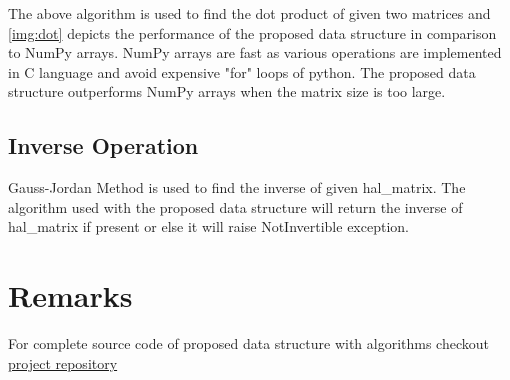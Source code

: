 \documentclass[11pt,twocolumn]{article}
\begin{document}
        The above algorithm is used to find the dot product of given two matrices and \cref{img:dot} depicts the performance of the proposed data structure in comparison to NumPy arrays. NumPy arrays are fast as various operations are implemented in C language and avoid expensive "for" loops of python. The proposed data structure outperforms NumPy arrays when the matrix size is too large.
        
    \subsection{Inverse Operation}

        Gauss-Jordan Method is used to find the inverse of given hal\_matrix. The algorithm used with the proposed data structure will return the inverse of hal\_matrix if present or else it will raise NotInvertible exception.
        
    \section{Remarks}

        For complete source code of proposed data structure with algorithms checkout \href{https://github.com/rishitoshsingh/hal-matrix}{project repository}
        
        
\end{document}
